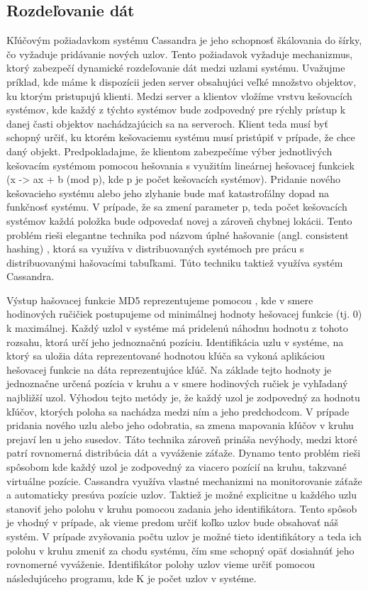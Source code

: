 \documentclass[11pt,twoside,a4paper]{book}
\begin{document}
\subsection{Rozdeľovanie dát}
Kľúčovým požiadavkom systému Cassandra je jeho schopnosť škálovania do šírky, čo vyžaduje pridávanie nových uzlov. Tento požiadavok vyžaduje mechanizmus, ktorý zabezpečí dynamické rozdeľovanie dát medzi uzlami systému. Uvažujme príklad, kde máme k dispozícii jeden server obsahujúci veľké množstvo objektov, ku ktorým pristupujú klienti. Medzi server a klientov vložíme vrstvu kešovacích systémov, kde každý z týchto systémov bude zodpovedný pre rýchly prístup k danej časti objektov nachádzajúcich sa na serveroch. Klient teda musí byť schopný určiť, ku ktorém kešovaciemu systému musí pristúpiť v prípade, že chce daný objekt. Predpokladajme, že klientom zabezpečíme výber jednotlivých kešovacím systémom pomocou hešovania s využitím lineárnej hešovacej funkciek (x -> ax + b (mod p), kde p je počet kešovacích systémov). Pridanie nového kešovacieho systému alebo jeho zlyhanie bude mať katastrofálny dopad na funkčnosť systému. V prípade, že sa zmení parameter p, teda počet kešovacích systémov každá položka bude odpovedať novej a zároveň chybnej lokácii. Tento problém rieši elegantne technika pod názvom úplné hašovanie (angl. consistent hashing) \cite{Karger:1997:CHR:258533.258660}, ktorá sa využíva v distribuovaných systémoch pre prácu s distribuovanými hašovacími tabuľkami. Túto techniku taktiež využíva systém Cassandra.

Výstup hašovacej funkcie MD5 reprezentujeme pomocou , kde v smere hodinových ručičiek postupujeme od minimálnej hodnoty hešovacej funkcie (tj. 0) k maximálnej. Každý uzlol v systéme má pridelenú náhodnu hodnotu z tohoto rozsahu, ktorá určí jeho jednoznačnú pozíciu. Identifikácia uzlu v systéme, na ktorý sa uložia dáta reprezentované hodnotou kľúča sa vykoná aplikáciou hešovacej funkcie na dáta reprezentujúce kľúč. Na základe tejto hodnoty je jednoznačne určená pozícia v kruhu a v smere hodinových ručiek je vyhľadaný najbližší uzol. Výhodou tejto metódy je, že každý uzol je zodpovedný za hodnotu kľúčov, ktorých poloha sa nachádza medzi ním a jeho predchodcom. V prípade pridania nového uzlu alebo jeho odobratia, sa zmena mapovania kľúčov v kruhu prejaví len u jeho susedov. Táto technika zároveň prináša nevýhody, medzi ktoré patrí rovnomerná distribúcia dát a vyváženie záťaže. Dynamo tento problém rieši spôsobom kde každý uzol je zodpovedný za viacero pozícií na kruhu, takzvané virtuálne pozície. Cassandra využíva vlastné mechanizmi na monitorovanie záťaže a automaticky presúva pozície uzlov. Taktiež je možné explicitne u každého uzlu stanoviť jeho polohu v kruhu pomocou zadania jeho identifikátora. Tento spôsob je vhodný v prípade, ak vieme predom určiť koľko uzlov bude obsahovať náš systém. V prípade zvyšovania počtu uzlov je možné tieto identifikátory a teda ich polohu v kruhu zmeniť za chodu systému, čím sme schopný opäť dosiahnúť jeho rovnomerné vyváženie. Identifikátor polohy uzlov vieme určiť pomocou následujúceho programu, kde K je počet uzlov v systéme.
\end{document}

